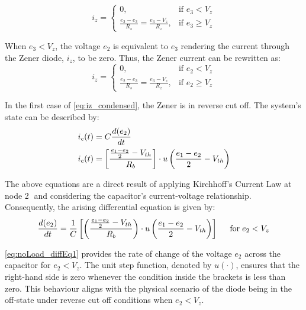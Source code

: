 \begin{equation}
	i_z = \begin{cases}
		0, & \text{if } e_3 < V_z \\
		\frac{e_2 - e_3}{R_s}=\frac{e_3 - V_z}{R_z}, & \text{if } e_3 \geq V_z
	\end{cases}
    \label{eq:iz_reverse_bias}
\end{equation}

When $e_3 < V_z$, the voltage $e_2$ is equivalent to $e_3$ rendering the current through the Zener diode, $i_z$, to be zero. Thus, the Zener current can be rewritten as:
\begin{equation}
    i_z=\begin{cases}
        0,  & \text{if } e_2 < V_z \\
        \frac{e_2-e_3}{R_s}=\frac{e_3-V_z}{R_z}, & \text{if } e_2 \geq V_z
    \end{cases}
    \label{eq:iz_condensed}
\end{equation}

In the first case of \eqref{eq:iz_condensed}, the Zener is in reverse cut off. The system's state can be described by:
\begin{equation}
    \begin{split}
        i_c(t) &= C\frac{d(e_2)}{dt} \\
        i_c(t) &= \left[\frac{\frac{e_1 - e_2}{2} - V_{th}}{R_b} \right]\cdot u\left(\frac{e_1 - e_2}{2} - V_{th} \right)
    \end{split}
    \label{eq:ic_reverse_bias}
\end{equation}

\pagebreak
The above equations are a direct result of applying Kirchhoff's Current Law at node \textcircled{2} and considering the capacitor's current-voltage relationship. Consequently, the arising differential equation is given by:
\begin{equation}
     \frac{d(e_2)}{dt}=\frac{1}{C} \left[\left(\frac{\frac{e_1 - e_2}{2} - V_{th}}{R_b} \right) \cdot u\left(\frac{e_1-e_2}{2}-V_{th} \right) \right] \hspace{0.5cm} \text{for} \hspace{0.1cm} e_2 < V_z
    \label{eq:noLoad_diffEq1}
\end{equation}

\eqref{eq:noLoad_diffEq1} provides the rate of change of the voltage $e_2$ across the capacitor for $e_2 < V_z$. The unit step function, denoted by $u(\cdot)$, ensures that the right-hand side is zero whenever the condition inside the brackets is less than zero. This behaviour aligns with the physical scenario of the diode being in the off-state under reverse cut off conditions when $e_2 < V_z$.


